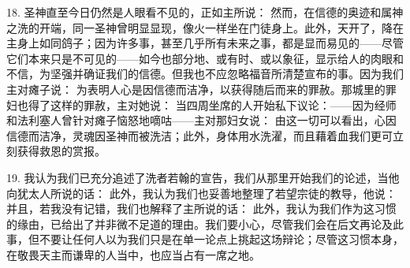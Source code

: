 18. 圣神直至今日仍然是人眼看不见的，正如主所说： 然而，在信德的奥迹和属神之洗的开端，同一圣神曾明显显现，像火一样坐在门徒身上。此外，天开了，降在主身上如同鸽子；因为许多事，甚至几乎所有未来之事，都是显而易见的——尽管它们本来只是不可见的——如今也部分地、或有时、或以象征，显示给人的肉眼和不信，为坚强并确证我们的信德。但我也不应忽略福音所清楚宣布的事。因为我们主对瘫子说： 为表明人心是因信德而洁净，以获得随后而来的罪赦。那城里的罪妇也得了这样的罪赦，主对她说： 当四周坐席的人开始私下议论：——因为经师和法利塞人曾针对瘫子恼怒地嘀咕——主对那妇女说： 由这一切可以看出，心因信德而洁净，灵魂因圣神而被洗洁；此外，身体用水洗濯，而且藉着血我们更可立刻获得救恩的赏报。\par

19. 我认为我们已充分追述了洗者若翰的宣告，我们从那里开始我们的论述，当他向犹太人所说的话： 此外，我认为我们也妥善地整理了若望宗徒的教导，他说： 并且，若我没有记错，我们也解释了主所说的话： 此外，我认为我们作为这习惯的缘由，已给出了并非微不足道的理由。我们要小心，尽管我们会在后文再论及此事，但不要让任何人以为我们只是在单一论点上挑起这场辩论；尽管这习惯本身，在敬畏天主而谦卑的人当中，也应当占有一席之地。\par

